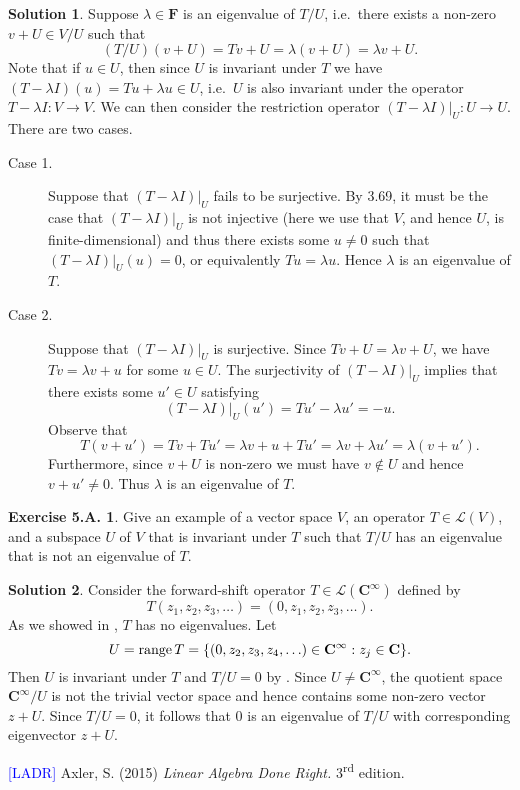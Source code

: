 \documentclass[12pt]{article}
\theoremstyle{definition}
\theoremstyle{exercise}
\newtheorem{exercise}{Exercise 5.A.}
\theoremstyle{solution}
\newtheorem*{solution}{Solution}
\newcommand{\lmap}{\mathcal{L}}
\newcommand{\ts}{\textsuperscript}
\newcommand{\Range}{\text{range\,}}
\newcommand{\C}{\mathbf{C}}
\newcommand{\F}{\mathbf{F}}
\begin{document}
\begin{solution}
    Suppose \( \lambda \in \F \) is an eigenvalue of \( T/U \), i.e.\ there exists a non-zero \( v + U \in V/U \) such that
    \[
        (T/U)(v + U) = Tv + U = \lambda(v + U) = \lambda v + U.
    \]
    Note that if \( u \in U \), then since \( U \) is invariant under \( T \) we have \( (T - \lambda I)(u) = Tu + \lambda u \in U \), i.e.\ \( U \) is also invariant under the operator \( T - \lambda I : V \to V \). We can then consider the restriction operator \( (T - \lambda I)|_U : U \to U \). There are two cases.
    \begin{description}
        \item[Case 1.] Suppose that \( (T - \lambda I)|_U \) fails to be surjective. By 3.69, it must be the case that \( (T - \lambda I)|_U \) is not injective (here we use that \( V \), and hence \( U \), is finite-dimensional) and thus there exists some \( u \neq 0 \) such that \( (T - \lambda I)|_U(u) = 0 \), or equivalently \( Tu = \lambda u \). Hence \( \lambda \) is an eigenvalue of \( T \).

        \item[Case 2.] Suppose that \( (T - \lambda I)|_U \) is surjective. Since \( Tv + U = \lambda v + U \), we have \( Tv = \lambda v + u \) for some \( u \in U \). The surjectivity of \( (T - \lambda I)|_U \) implies that there exists some \( u' \in U \) satisfying
        \[
            (T - \lambda I)|_U(u') = Tu' - \lambda u' = -u.
        \]
        Observe that
        \[
            T(v + u') = Tv + Tu' = \lambda v + u + Tu' = \lambda v + \lambda u' = \lambda(v + u').
        \]
        Furthermore, since \( v + U \) is non-zero we must have \( v \not\in U \) and hence \( v + u' \neq 0 \). Thus \( \lambda \) is an eigenvalue of \( T \).
    \end{description}
\end{solution}

\begin{exercise}
\label{ex:36}
    Give an example of a vector space \( V \), an operator \( T \in \lmap(V) \), and a subspace \( U \) of \( V \) that is invariant under \( T \) such that \( T/U \) has an eigenvalue that is not an eigenvalue of \( T \).
\end{exercise}

\begin{solution}
    Consider the forward-shift operator \( T \in \lmap(\C^{\infty}) \) defined by
    \[
        T(z_1, z_2, z_3, \ldots) = (0, z_1, z_2, z_3, \ldots).
    \]
    As we showed in , \( T \) has no eigenvalues. Let
    \[
        U = \Range T = \{ (0, z_2, z_3, z_4, \ldots) \in \C^{\infty} : z_j \in \C \}.
    \]
    Then \( U \) is invariant under \( T \) and \( T/U = 0 \) by . Since \( U \neq \C^{\infty} \), the quotient space \( \C^{\infty}/U \) is not the trivial vector space and hence contains some non-zero vector \( z + U \). Since \( T/U = 0 \), it follows that 0 is an eigenvalue of \( T/U \) with corresponding eigenvector \( z + U \).
\end{solution}

\noindent \hrulefill

\noindent \hypertarget{ladr}{\textcolor{blue}{[LADR]} Axler, S. (2015) \textit{Linear Algebra Done Right.} 3\ts{rd} edition.}
\end{document}
